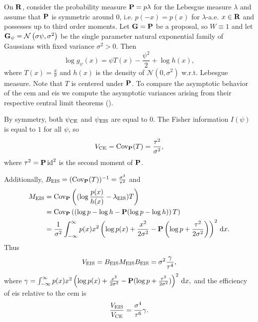 \begin{example}
    \label{ex:univ-gaussian-s2-fixed}
    On $\R$, consider the probability measure $\P = p\lambda$ for the Lebesgue measure $\lambda$ and assume that $\P$ is symmetric around $0$, i.e. $p(-x) = p(x)$ for $\lambda$-a.e. $x\in\R$ and possesses up to third order moments.
    Let $\G=\P$ be a proposal, so $W\equiv1$ and let $\G_{\psi} = \mathcal N \left( \sigma\psi, \sigma^{2} \right)$ be the single parameter natural exponential family of Gaussians with fixed variance $\sigma^{2} > 0$. Then 
    $$
    \log g_{\psi}(x) = \psi T(x) - \frac{\psi^{2}}{2} + \log h(x),
    $$
    where $T(x) = \frac{x}{\sigma}$ and $h(x)$ is the density of $\mathcal N(0, \sigma^{2})$ w.r.t. Lebesgue measure. 
    Note that $T$ is centered under $\P$. To compare the asymptotic behavior of the \gls{cem} and \gls{eis} we compute the asymptotic variances arising from their respective central limit theorems ().

    By symmetry, both $\pce$ and $\peis$ are equal to $0$. 
    The Fisher information $I(\psi)$ is equal to $1$ for all $\psi$, so 
    \begin{align}
    \label{eq:ce-gaussian-mean-var}
        V_{\ce} = \cov_{\P}(T) = \frac{\tau^{2}}{\sigma^{2}},
    \end{align}
    where $\tau^{2}=\P \operatorname{id}^{2}$ is the second moment of $\P$. 

    Additionally, $B_{\eis} = (\cov_{\P}(T))^{-1} = \frac{\sigma^{2}}{\tau^{2}}$ and
    \begin{align*}
    M_{\eis} &= \cov_{\P} \left( (\log \frac{p(x)}{h(x)} - \lambda_{\eis})T\right) \\
        &= \cov_{\P} \left(\left( \log p - \log h - \P (\log p - \log h) \right) T \right) \\
        &= \frac{1}{\sigma^{2}}\int_{-\infty}^{\infty} p(x) x^{2}\left(\log p(x) + \frac{x^{2}}{2\sigma^{2}} - \P\left(\log p + \frac{\tau^{2}}{2\sigma^{2}}\right)\right)^{2} \d x.
    \end{align*}
    Thus
    $$
    V_{\eis} = B_{\eis}M_{\eis}B_{\eis}= \sigma^{2}\frac{\gamma}{\tau^{4}},
    $$
    where $\gamma = \int_{-\infty}^\infty p(x) x^{2}\left(\log p(x) + \frac{x^{2}}{2\sigma^{2}} - \P(\log p + \frac{\tau^{2}}{2\sigma^{2}})\right)^{2} \d x,$ and the efficiency of \acrshort{eis} relative to the \acrshort{cem} is 
    $$
        \frac{V_{\eis}}{V_{\ce}} = \frac{\sigma^{4}}{\tau^{6}} \gamma.
    $$
    

\end{example}
